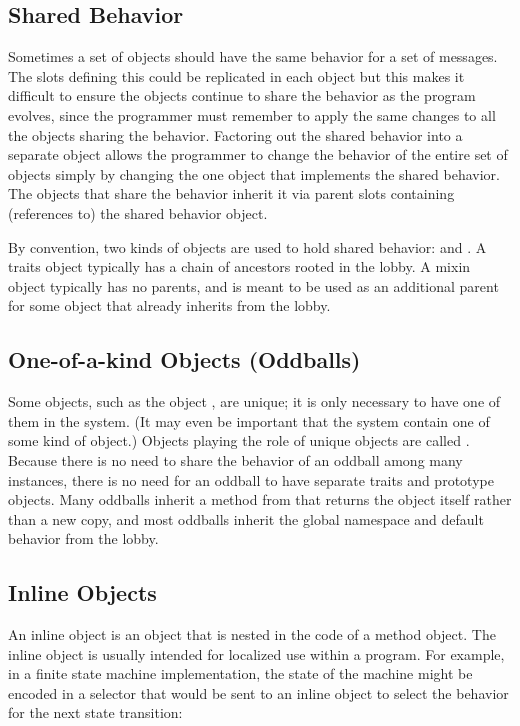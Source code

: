 \documentclass[letterpaper,10pt,english]{sphinxmanual}
\begin{document}
\subsection{Shared Behavior}
\label{\detokenize{progguid:shared-behavior}}
Sometimes a set of objects should have the same behavior for a set of messages. The slots defining
this  could be replicated in each object but this makes it difficult to ensure the objects
continue to share the behavior as the program evolves, since the programmer must remember
to apply the same changes to all the objects sharing the behavior. Factoring out the shared behavior
into a separate object allows the programmer to change the behavior of the entire set of objects simply
by changing the one object that implements the shared behavior. The objects that share the
behavior inherit it via parent slots containing (references to) the shared behavior object.

By convention, two kinds of objects are used to hold shared behavior:  and . A traits
object typically has a chain of ancestors rooted in the lobby. A mixin object typically has no parents,
and is meant to be used as an additional parent for some object that already inherits from the
lobby.


\subsection{One-of-a-kind Objects (Oddballs)}
\label{\detokenize{progguid:one-of-a-kind-objects-oddballs}}
Some objects, such as the object , are unique; it is only necessary to have one of them in the
system. (It may even be important that the system contain  one of some kind of object.) Objects
playing the role of unique objects are called . Because there is no need to share the
behavior of an oddball among many instances, there is no need for an oddball to have separate
traits and prototype objects. Many oddballs inherit a  method from  that
returns the object itself rather than a new copy, and most oddballs inherit the global namespace and
default behavior from the lobby.


\subsection{Inline Objects}
\label{\detokenize{progguid:inline-objects}}
An inline object is an object that is nested in the code of a method object. The inline object is usually
intended for localized use within a program. For example, in a finite state machine implementation,
the state of the machine might be encoded in a selector that would be sent to an inline object
to select the behavior for the next state transition:
\end{document}
